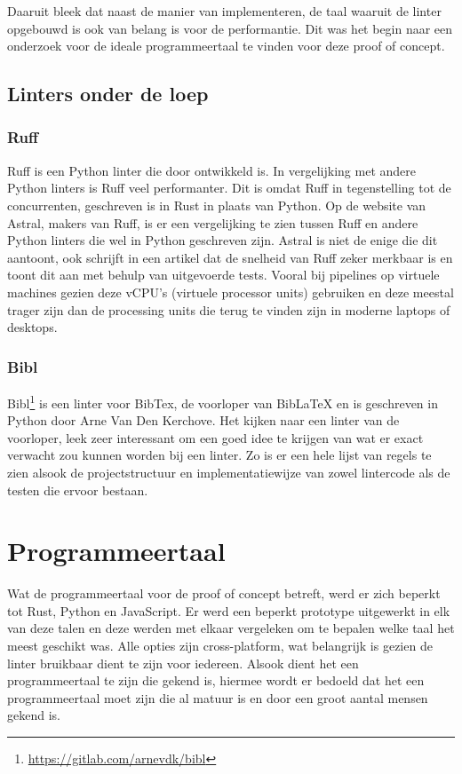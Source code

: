 Daaruit bleek dat naast de manier van implementeren, de taal waaruit de linter opgebouwd is ook van belang is voor de performantie. Dit was het begin naar een onderzoek voor de ideale programmeertaal te vinden voor deze proof of concept. 

\subsection{Linters onder de loep}
\subsubsection{Ruff}
Ruff is een Python linter die door \textcite{Astral2024} ontwikkeld is. In vergelijking met andere Python linters is Ruff veel performanter. Dit is omdat Ruff in tegenstelling tot de concurrenten, geschreven is in Rust in plaats van Python. Op de website van Astral, makers van Ruff, is er een vergelijking te zien tussen Ruff en andere Python linters die wel in Python geschreven zijn. Astral is niet de enige die dit aantoont, ook \textcite{TurnerTrauring2023} schrijft in een artikel dat de snelheid van Ruff zeker merkbaar is en toont dit aan met behulp van uitgevoerde tests. Vooral bij pipelines op virtuele machines gezien deze vCPU's (virtuele processor units) gebruiken en deze meestal trager zijn dan de processing units die terug te vinden zijn in moderne laptops of desktops.

\subsubsection{Bibl}
Bibl\footnote{\url{https://gitlab.com/arnevdk/bibl}} is een linter voor BibTex, de voorloper van BibLaTeX en is geschreven in Python door Arne Van Den Kerchove. Het kijken naar een linter van de voorloper, leek zeer interessant om een goed idee te krijgen van wat er exact verwacht zou kunnen worden bij een linter. Zo is er een hele lijst van regels te zien alsook de projectstructuur en implementatiewijze van zowel lintercode als de testen die ervoor bestaan.

\section{Programmeertaal}
Wat de programmeertaal voor de proof of concept betreft, werd er zich beperkt tot Rust, Python en JavaScript. Er werd een beperkt prototype uitgewerkt in elk van deze talen en deze werden met elkaar vergeleken om te bepalen welke taal het meest geschikt was. Alle opties zijn cross-platform, wat belangrijk is gezien de linter bruikbaar dient te zijn voor iedereen. Alsook dient het een programmeertaal te zijn die gekend is, hiermee wordt er bedoeld dat het een programmeertaal moet zijn die al matuur is en door een groot aantal mensen gekend is.

